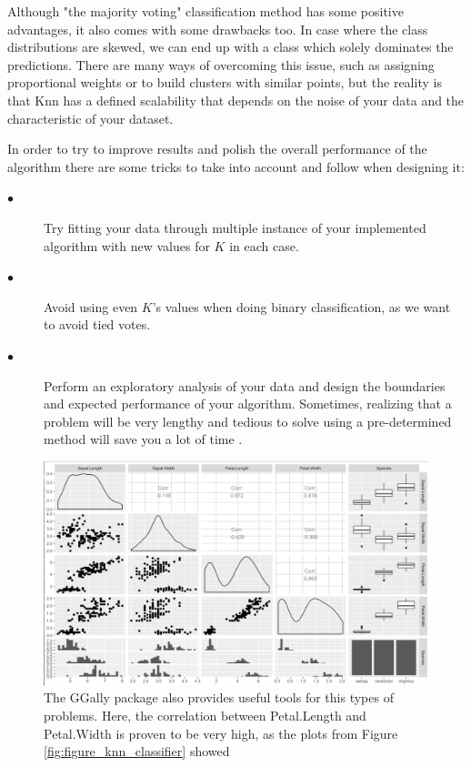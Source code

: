 Although "the majority voting" classification method has some positive advantages, it also comes with some drawbacks too. In case where the class distributions are skewed, we can end up with a class which solely dominates the predictions. There are many ways of overcoming this issue, such as assigning proportional weights or to build clusters with similar points, but the reality is that Knn has a defined scalability that depends on the noise of your data and the characteristic of your dataset. \par

In order to try to improve results and polish the overall performance of the algorithm there are some tricks to take into account and follow when designing it: \par

\begin{description}
	
	\item[$\bullet$] Try fitting your data through multiple instance of your implemented algorithm with new values for $K$ in each case.
	
	\item[$\bullet$] Avoid using even $K$'s values when doing binary classification, as we want to avoid tied votes.
	
	\item[$\bullet$] Perform an exploratory analysis of your data and design the boundaries and expected performance of your algorithm. Sometimes, realizing that a problem will be very lengthy and tedious to solve using a pre-determined method will save you a lot of time .
	
\end{description}

\begin{figure}[H]
	\centering
	\includegraphics[width=15cm]{Figuras_tfg/R_plot_correlation.png}
	\caption{The GGally package also provides useful tools for this types of problems. Here, the correlation between Petal.Length and Petal.Width is proven to be very high, as the plots from Figure \ref{fig:figure_knn_classifier} showed}
	\label{fig:figure_knn_classifier_correlation}
\end{figure}

